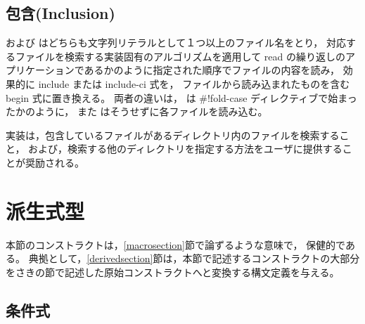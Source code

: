 \subsection{包含(Inclusion)}\unsection
\label{inclusion}
\begin{entry}{%
}

\semantics
{} および  はどちらも文字列リテラルとして１つ以上のファイル名をとり，
対応するファイルを検索する実装固有のアルゴリズムを適用して
{\cf read} の繰り返しのアプリケーションであるかのように指定された順序でファイルの内容を読み，
効果的に {\cf include} または {\cf include-ci} 式を，
ファイルから読み込まれたものを含む {\cf begin} 式に置き換える。
両者の違いは， は {\cf{}\#!fold-case} ディレクティブで始まったかのように，
また  はそうせずに各ファイルを読み込む。

\begin{note}
実装は，包含しているファイルがあるディレクトリ内のファイルを検索すること，
および，検索する他のディレクトリを指定する方法をユーザに提供することが奨励される。
\end{note}

\end{entry}

\section{派生式型}
\label{derivedexps}

本節のコンストラクトは，\ref{macrosection}節で論ずるような意味で，
保健的である。
典拠として，\ref{derivedsection}節は，本節で記述するコンストラクトの大部分
をさきの節で記述した原始コンストラクトへと変換する構文定義を与える。


\subsection{条件式}\unsection


